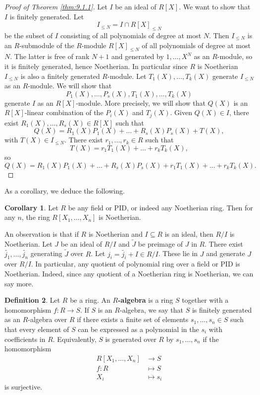 \documentclass{article}
\newcommand{\rb}[1]{\left( #1 \right)}
\renewcommand{\sb}[1]{\left[ #1 \right]}
\theoremstyle{definition}\newtheorem{definition}{Definition}[subsection]
\theoremstyle{definition}\newtheorem{remark}[definition]{Remark}
\theoremstyle{definition}\newtheorem*{example}{Example}
\theoremstyle{definition}\newtheorem*{note}{Note}
\newtheorem{corollary}[definition]{Corollary}
\begin{document}
\begin{proof}[Proof of Theorem \ref{thm:9.1.1}]
Let $ I $ be an ideal of $ R\sb{X} $. We want to show that $ I $ is finitely generated. Let
$$ I_{\le N} = I \cap R\sb{X}_{\le N} $$
be the subset of $ I $ consisting of all polynomials of degree at most $ N $. Then $ I_{\le N} $ is an $ R $-submodule of the $ R $-module $ R\sb{X}_{\le N} $ of all polynomials of degree at most $ N $. The latter is free of rank $ N + 1 $ and generated by $ 1, \dots, X^N $ as an $ R $-module, so it is finitely generated, hence Noetherian. In particular since $ R $ is Noetherian $ I_{\le N} $ is also a finitely generated $ R $-module. Let $ T_1\rb{X}, \dots, T_k\rb{X} $ generate $ I_{\le N} $ as an $ R $-module. We will show that
$$ P_1\rb{X}, \dots, P_s\rb{X}, T_1\rb{X}, \dots, T_k\rb{X} $$
generate $ I $ as an $ R\sb{X} $-module. More precisely, we will show that $ Q\rb{X} $ is an $ R\sb{X} $-linear combination of the $ P_i\rb{X} $ and $ T_j\rb{X} $. Given $ Q\rb{X} \in I $, there exist $ R_1\rb{X}, \dots, R_s\rb{X} \in R\sb{X} $ such that
$$ Q\rb{X} = R_1\rb{X}P_1\rb{X} + \dots + R_s\rb{X}P_s\rb{X} + T\rb{X}, $$
with $ T\rb{X} \in I_{\le N} $. There exist $ r_1, \dots, r_k \in R $ such that
$$ T\rb{X} = r_1T_1\rb{X} + \dots + r_kT_k\rb{X}, $$
so
$$ Q\rb{X} = R_1\rb{X}P_1\rb{X} + \dots + R_s\rb{X}P_s\rb{X} + r_1T_1\rb{X} + \dots + r_kT_k\rb{X}. $$
\end{proof}

As a corollary, we deduce the following.

\begin{corollary}
Let $ R $ be any field or PID, or indeed any Noetherian ring. Then for any $ n $, the ring $ R\sb{X_1, \dots, X_n} $ is Noetherian.
\end{corollary}

An observation is that if $ R $ is Noetherian and $ I \subseteq R $ is an ideal, then $ R / I $ is Noetherian. Let $ J $ be an ideal of $ R / I $ and $ \widetilde{J} $ be preimage of $ J $ in $ R $. There exist $ \widetilde{j_1}, \dots, \widetilde{j_n} $ generating $ \widetilde{J} $ over $ R $. Let $ j_i = \widetilde{j_i} + I \in R / I $. These lie in $ J $ and generate $ J $ over $ R / I $. In particular, any quotient of polynomial ring over a field or PID is Noetherian. Indeed, since any quotient of a Noetherian ring is Noetherian, we can say more.

\begin{definition}
Let $ R $ be a ring. An \textbf{$ R $-algebra} is a ring $ S $ together with a homomorphism $ f : R \to S $. If $ S $ is an $ R $-algebra, we say that $ S $ is finitely generated as an $ R $-algebra over $ R $ if there exists a finite set of elements $ s_1, \dots, s_n \in S $ such that every element of $ S $ can be expressed as a polynomial in the $ s_i $ with coefficients in $ R $. Equivalently, $ S $ is generated over $ R $ by $ s_1, \dots, s_n $ if the homomorphism
\begin{align*}
R\sb{X_1, \dots, X_n} & \to S \\
f : R & \mapsto S \\
X_i & \mapsto s_i
\end{align*}
is surjective.
\end{definition}
\end{document}
